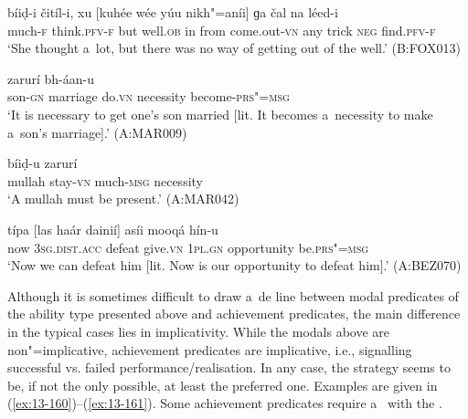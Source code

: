 \begin{exe}
\ex
\label{ex:13-156}
\gll bíiḍ-i čitíl-i, xu [kuhée wée yúu   nikh"=aníi] ɡa čal na léed-i  \\
much-\textsc{f} think.\textsc{pfv-f} but well.\textsc{ob} in from  come.out-\textsc{vn} any trick \textsc{neg} find.\textsc{pfv-f}  \\
\glt `She thought a~lot, but there was no way of getting out of the well.' (B:FOX013)

\ex
\label{ex:13-157}
 zarurí bh-áan-u \\
son-\textsc{gn} marriage do.\textsc{vn} necessity become-\textsc{prs"=msg}  \\
\glt `It is necessary to get one's son married [lit. It becomes a~necessity to make a~son's marriage].' (A:MAR009)

\ex
\label{ex:13-158}
\gll [muloó haans"=ainií] bíiḍ-u zarurí \\
mullah stay-\textsc{vn}  much-\textsc{msg} necessity  \\
\glt `A mullah must be present.' (A:MAR042)

\ex
\label{ex:13-159}
\gll típa [las haár dainií] asíi mooqá  hín-u \\
now \textsc{3sg.dist.acc} defeat give.\textsc{vn} \textsc{1pl.gn} opportunity be.\textsc{prs"=msg}  \\
\glt `Now we can defeat him [lit. Now is our opportunity to defeat him].' (A:BEZ070) 
\end{exe}

 Although it is sometimes difficult to draw a~de line between modal predicates of the ability type presented above and achievement predicates, the main difference in the typical cases lies in implicativity. While the modals above are non"=implicative, achievement predicates are implicative, i.e., signalling successful vs. failed performance/realisation. In any case, the  strategy seems to be, if not the only possible, at least the preferred one. Examples are given in (\ref{ex:13-160})--(\ref{ex:13-161}). Some achievement predicates require a~ with the .

